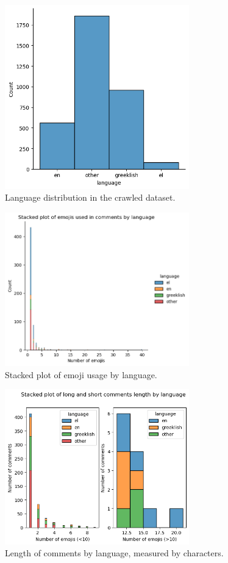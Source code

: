 \documentclass[11pt, a4paper]{article}
\begin{document}
	\begin{figure}[h!]
		\includegraphics[width=8cm]{lang_dis.png}
		\centering
		\caption{Language distribution in the crawled dataset.}
		\label{fig::lang_dis}
	\end{figure}
	
	\begin{figure}[h!]
		\includegraphics[width=8cm]{emojis_dis.png}
		\centering
		\caption{Stacked plot of emoji usage by language.}
		\label{fig::emojis_dist}
	\end{figure}
	
	\begin{figure}[h!]
		\includegraphics[width=8cm]{length_dis.png}
		\centering
		\caption{Length of comments by language, measured by characters.}
		\label{fig:length_dis}
	\end{figure}
	
\end{document}
